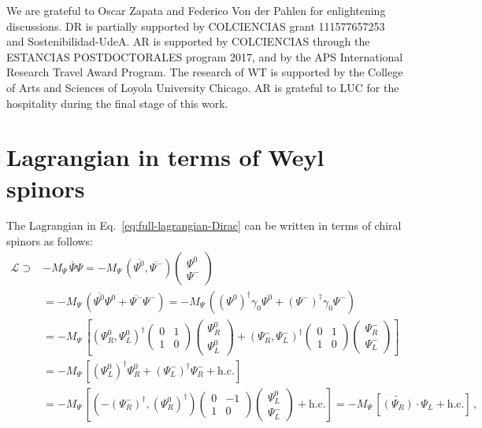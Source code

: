 \documentclass[12pt,letterpaper]{article}
\begin{document}
We are grateful to Oscar Zapata and Federico Von der Pahlen for enlightening discussions. DR is partially  supported by COLCIENCIAS grant 111577657253 and Sostenibilidad-UdeA.
AR is supported by COLCIENCIAS through the ESTANCIAS POSTDOCTORALES program 2017, and by the APS  International Research Travel Award Program.
The research of WT is supported by the College of Arts and Sciences of Loyola University Chicago. 
AR is grateful to LUC for the hospitality during the final stage of this work.


\appendix

\section{Lagrangian in terms of Weyl spinors }
\label{sec:l-weyl-spinors}
The Lagrangian in Eq.~\eqref{eq:full-lagrangian-Dirac} can be written in terms of chiral spinors as follows:
\begin{align}
\label{eq:mass-term}
\mathcal{L} \supset &
-M_{\Psi}\, \overline{\Psi}\Psi
= -M_{\Psi}\,(\overline{\Psi^0},\overline{\Psi^-})\begin{pmatrix}
\Psi^0 \\ \Psi^-
\end{pmatrix}\nonumber\\
&=-M_{\Psi}\,(\overline{\Psi^0}\Psi^0 + \overline{\Psi^-}\Psi^-)
= -M_{\Psi}\,((\Psi^0)^\dagger \gamma_0 \Psi^0 + (\Psi^-)^\dagger \gamma_0 \Psi^-)\nonumber\\
&=-M_{\Psi}\,\left[(\Psi^0_R,\Psi^0_L )^\dagger \begin{pmatrix}
0 & 1\\
1 & 0
\end{pmatrix}\begin{pmatrix}
\Psi^0_R \\ \Psi^0_L
\end{pmatrix}
+(\Psi^-_R,\Psi^-_L )^\dagger \begin{pmatrix}
0 & 1 \\
1 & 0
\end{pmatrix} 
\begin{pmatrix}
\Psi^-_R \\ \Psi^-_L
\end{pmatrix}\right]\nonumber\\
&= -M_{\Psi}\,\left[(\Psi^0_L )^\dagger\Psi^0_R + (\Psi^-_L )^\dagger\Psi^-_R + \text{h.c.}\right]\nonumber\\
&=-M_{\Psi}\,\left[(-(\Psi^-_R)^\dagger,(\Psi^0_R)^\dagger) \begin{pmatrix}
0 & -1\\
1 & 0
\end{pmatrix} 
\begin{pmatrix}
\Psi^0_L\\ \Psi^-_L
\end{pmatrix} + \text{h.c.} \right]
=-M_{\Psi}\, \left[\widetilde{(\Psi_R)} \cdot \Psi_L + \text{h.c.}\right]\,,
\end{align}
\end{document}
